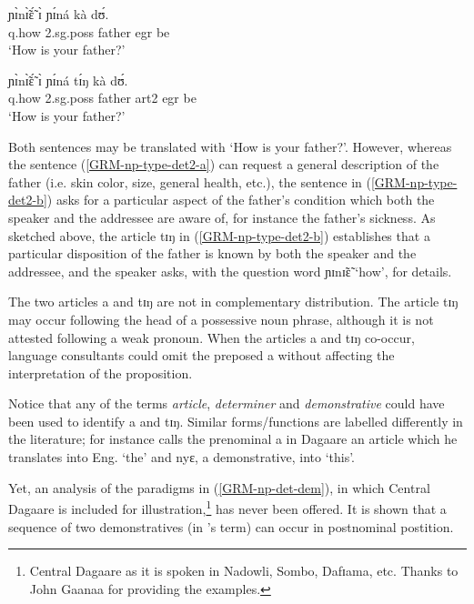 \begin{exe}
\begin{exe}
\begin{exe}
{\begin{exe}
\begin{exe}
\begin{exe}
\begin{exe}
\ea\label{GRM-np-type-det2-ab}
 
  \ea\label{GRM-np-type-det2-a}
\gll ɲɪ̀nɪ̃̀ɛ̃́ ɪ̀ ɲɪ́ná kà dʊ́.\\
 {\sc q}.how {\sc 2.sg.poss} father {\sc  egr} be\\
\glt  `How is your father?'

  \ex\label{GRM-np-type-det2-b}
\gll ɲɪ̀nɪ̃̀ɛ̃́ ɪ̀ ɲɪ́ná tɪ́ŋ kà dʊ́.\\
   {\sc q}.how {\sc 2.sg.poss} father {\sc art2} {\sc  egr} be\\
\glt  `How is your father?'
  
 
\z 
 \z


Both sentences may be translated with `How is your father?'. However, whereas 
the sentence (\ref{GRM-np-type-det2-a}) can request  a general description
of the father (i.e. skin color, size, general health, etc.), the sentence
in (\ref{GRM-np-type-det2-b}) asks for a particular aspect of the
father's condition which both the speaker and the addressee are aware of, for
instance the father's sickness. As sketched above, the article {\sls tɪŋ}  in
(\ref{GRM-np-type-det2-b}) establishes that a particular disposition of the
father is known  by both the speaker and the addressee,  and the speaker
asks, with the question word {\sls ɲɪnɪ̃ɛ̃} `how',   for details. 

The two  articles {\sls a} and {\sls tɪŋ}  are not in complementary 
distribution.
The article {\sls tɪŋ} may occur following the head of a possessive noun phrase,
although it is not attested  following a weak pronoun. When the articles {\sls 
a} and {\sls tɪŋ} co-occur,  language consultants could omit
the preposed {\sls a}  without affecting the interpretation of the
 proposition. 

Notice that any of the terms {\it article}, {\it determiner} and
{\it demonstrative} could have been used to identify {\sls a} and {\sls tɪŋ}.
Similar forms/functions are labelled differently in the
literature; for instance \citet[47]{Bodo97} calls the prenominal {\sls a} in
Dagaare an article which he translates into Eng. `the'  and  {\sls nyɛ},  a 
demonstrative, into `this'.  


Yet, an analysis of the paradigms in (\ref{GRM-np-det-dem}),  in which Central 
Dagaare is included for illustration,\footnote{Central Dagaare as it is spoken 
in Nadowli, Sombo, Dafɪama, etc. Thanks to John Gaanaa for providing the 
examples. } has never been offered. It is shown that a sequence of two 
demonstratives (in \citeauthor{Bodo97}'s term)  can occur in postnominal 
postition.



\end{exe}
\end{exe}
\end{exe}
\end{exe}}
\end{exe}
\end{exe}
\end{exe}
